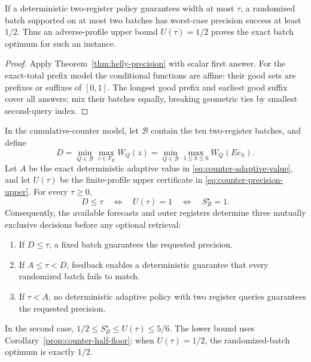 \begin{corollary}
\label{prop:counter-half-floor}
If a deterministic two-register policy guarantees width at most $\tau$,
a randomized batch supported on at most two batches has worst-case
precision success at least $1/2$. Thus an adverse-profile upper bound
$U(\tau)=1/2$ proves the exact batch optimum for such an instance.
\end{corollary}
\begin{proof}
Apply Theorem~\ref{thm:helly-precision} with scalar first answer.
For the exact-total prefix model the conditional functions are affine:
their good sets are prefixes or suffixes of $[0,1]$. The longest good
prefix and earliest good suffix cover all answers; mix their batches
equally, breaking geometric ties by smallest second-query index.
\end{proof}
\begin{corollary}
\label{cor:counter-feedback-triage}
In the cumulative-counter model, let $\mathcal B$ contain the ten
two-register batches, and define
\[
 D=\min_{Q\in\mathcal B}\max_{z\in F_E}W_Q(z)
   =\min_{Q\in\mathcal B}\max_{1\leq h\leq6}W_Q(Ee_h).
\]
Let $A$ be the exact deterministic adaptive value in
\eqref{eq:counter-adaptive-value}, and let $U(\tau)$ be the
finite-profile upper certificate in \eqref{eq:counter-precision-upper}.
For every $\tau\geq0$,
\[
 D\leq\tau
 \quad\Longleftrightarrow\quad U(\tau)=1
 \quad\Longleftrightarrow\quad S_B^\star=1.
\]
Consequently, the available forecasts and outer registers determine
three mutually exclusive decisions before any optional retrieval:
\begin{enumerate}
\item If $D\leq\tau$, a fixed batch guarantees the requested precision.
\item If $A\leq\tau<D$, feedback enables a deterministic guarantee that
      every randomized batch fails to match.
\item If $\tau<A$, no deterministic adaptive policy with two register
      queries guarantees the requested precision.
\end{enumerate}
In the second case,
$1/2\leq S_B^\star\leq U(\tau)\leq5/6$.
The lower bound uses Corollary~\ref{prop:counter-half-floor}; when
$U(\tau)=1/2$, the randomized-batch optimum is exactly $1/2$.
\end{corollary}
